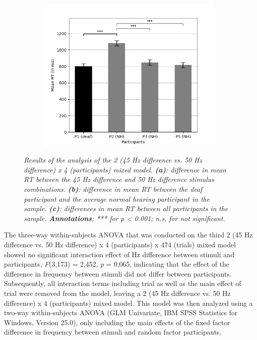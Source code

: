 \documentclass[12pt]{article}
\begin{document}
\begin{figure}[t!]
  \centering
  \begin{subfigure}[h]{0.5\textwidth}
    \includegraphics[width=\textwidth]{45Hz_50Hz_all_bars.png}
    \caption{}
    \label{fig:3c}
  \end{subfigure}
\caption{\textit{\footnotesize{Results of the analysis of the 2 (45 Hz difference vs.  50 Hz difference) x 4 (participants) mixed
model. \textbf{(a)}: difference in mean RT between the 45 Hz difference and 50 Hz difference stimulus combinations. \textbf{(b)}: difference in mean RT between the deaf participant and the average normal hearing participant in the sample. \textbf{(c)}: differences in mean RT between all participants in the sample. \textbf{Annotations}: *** for \textit{p} < 0.001; \textit{n.s.} for not significant.}}}
\end{figure}
%
\par The three-way within-subjects ANOVA that was conducted on the third 2 (45 Hz difference vs. 50 Hz difference) x 4 (participants) x 474 (trials) mixed model showed no significant interaction effect of Hz difference between stimuli and participants, \textit{F}(3,173) = 2,452, \textit{p} = 0,065, indicating that the effect of the difference in frequency between stimuli did not differ between participants. Subsequently, all interaction terms including trial as well as the main effect of trial were removed from the model, leaving a 2 (45 Hz difference vs. 50 Hz difference) x 4 (participants) mixed model. This model was then analyzed using a two-way within-subjects ANOVA (GLM Univariate, IBM SPSS Statistics for Windows, Version 25.0), only including the main effects of the fixed factor difference in frequency between stimuli and random factor participants. 
\end{document}
